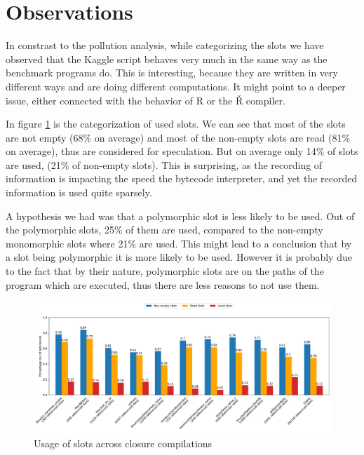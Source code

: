 \section{Observations}


In constrast to the pollution analysis, while categorizing the slots we have observed that the Kaggle script behaves very much in the same way as the benchmark programs do. This is interesting, because they are written in very different ways and are doing different computations. It might point to a deeper issue, either connected with the behavior of R or the Ř compiler.

In figure \ref{fig:graph-overview} is the categorization of used slots. We can see that most of the slots are not empty (68\% on average) and most of the non-empty slots are read (81\% on average), thus are considered for speculation. But on average only 14\% of slots are used, (21\% of non-empty slots). This is surprising, as the recording of information is impacting the speed the bytecode interpreter, and yet the recorded information is used quite sparsely.

A hypothesis we had was that a polymorphic slot is less likely to be used. Out of the polymorphic slots, 25\% of them are used, compared to the non-empty monomorphic slots where 21\% are used. This might lead to a conclusion that by a slot being polymorphic it is more likely to be used. However it is probably due to the fact that by their nature, polymorphic slots are on the paths of the program which are executed, thus there are less reasons to not use them.

\begin{figure}
	\centering
	\begin{adjustwidth}{-3cm}{-3cm}
		\includegraphics[width=1.5\textwidth]{figures/usage_overall.pdf}
	\end{adjustwidth}
	\caption{Usage of slots across closure compilations}\label{fig:graph-overview}
\end{figure}

